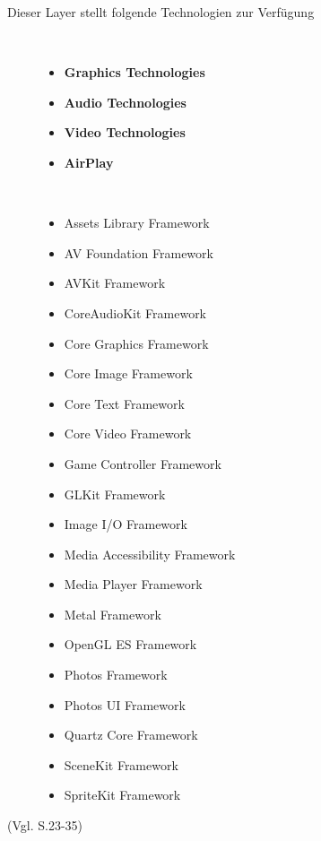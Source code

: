 \begin{description}
	\item[Dieser Layer stellt folgende Technologien zur Verfügung]~\par
    \begin{itemize}
		\item \textbf{Graphics Technologies}
		\item \textbf{Audio Technologies}
		\item \textbf{Video Technologies}
		\item \textbf{AirPlay}
    \end{itemize}

    \item[\parbox{\textwidth} {Das Media Layer Framework beinhaltet folgende Frameworks}]~\par
	\begin{multicols}{2}
	\begin{itemize}
		\item Assets Library Framework
		\item AV Foundation Framework
		\item AVKit Framework
		\item CoreAudioKit Framework
		\item Core Graphics Framework
		\item Core Image Framework
		\item Core Text Framework
		\item Core Video Framework
		\item Game Controller Framework
		\item GLKit Framework
		\item Image I/O Framework
		\item Media Accessibility Framework
		\item Media Player Framework
		\item Metal Framework
		\item OpenGL ES Framework
		\item Photos Framework
		\item Photos UI Framework
		\item Quartz Core Framework
		\item SceneKit Framework
		\item SpriteKit Framework
         \end{itemize}
	\end{multicols}
\end{description}
(Vgl. \cite{Apple[6]} S.23-35)
